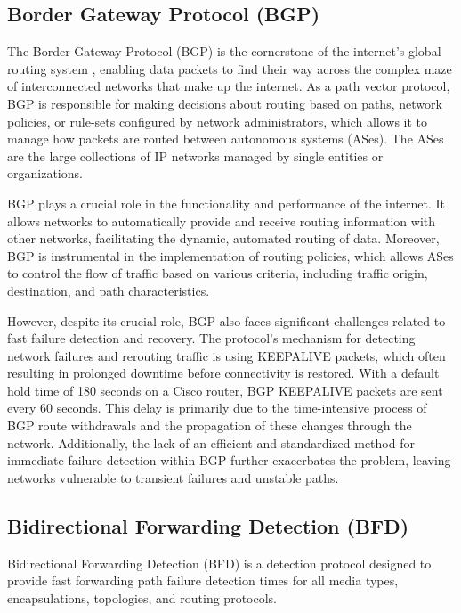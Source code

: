 \documentclass[12pt]{article}
\begin{document}
\subsection{Border Gateway Protocol (BGP)}
The Border Gateway Protocol (BGP) is the cornerstone of the internet's global routing system \cite{ref12}, enabling data packets to find their way across the complex maze of interconnected networks that make up the internet. As a path vector protocol, BGP is responsible for making decisions about routing based on paths, network policies, or rule-sets configured by network administrators\cite{ref6}, which allows it to manage how packets are routed between autonomous systems (ASes). The ASes are the large collections of IP networks managed by single entities or organizations.

BGP plays a crucial role in the functionality and performance of the internet. It allows networks to automatically provide and receive routing information with other networks, facilitating the dynamic, automated routing of data. Moreover, BGP is instrumental in the implementation of  routing policies, which allows ASes to control the flow of traffic based on various criteria, including traffic origin, destination, and path characteristics.

However, despite its crucial role, BGP also faces significant challenges related to fast failure detection and recovery. The protocol's mechanism for detecting network failures and rerouting traffic is using KEEPALIVE packets, which often resulting in prolonged downtime before connectivity is restored. With a default hold time of 180 seconds on a Cisco router, BGP KEEPALIVE packets are sent every 60 seconds\cite{ref3}. This delay is primarily due to the time-intensive process of BGP route withdrawals and the propagation of these changes through the network. Additionally, the lack of an efficient and standardized method for immediate failure detection within BGP further exacerbates the problem, leaving networks vulnerable to transient failures and unstable paths.

\subsection{Bidirectional Forwarding Detection (BFD)}
Bidirectional Forwarding Detection (BFD) is a detection protocol designed to provide fast forwarding path
failure detection times for all media types, encapsulations, topologies, and routing protocols.\cite{ref1}
\end{document}
